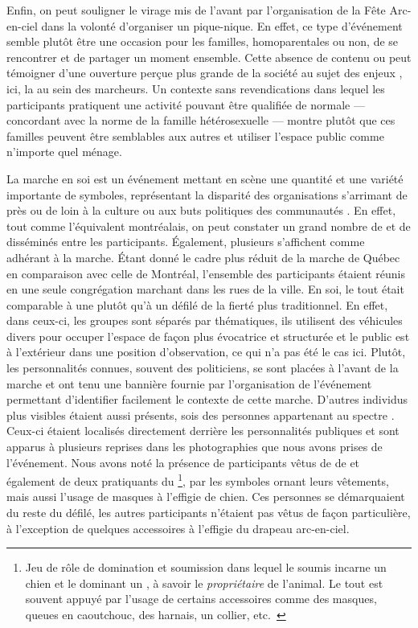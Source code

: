 Enfin, on peut souligner le virage  mis de l'avant par l'organisation de la Fête Arc-en-ciel dans la volonté d'organiser un pique-nique.
En effet, ce type d'événement semble plutôt être une occasion pour les familles, homoparentales ou non, de se rencontrer et de partager un moment ensemble.
Cette absence de contenu  ou  peut témoigner d'une ouverture perçue plus grande de la société au sujet des enjeux \lgbt, ici, la  au sein des marcheurs.
Un contexte sans revendications dans lequel les participants pratiquent une activité pouvant être qualifiée de normale --- concordant avec la norme de la famille hétérosexuelle --- montre plutôt que ces familles peuvent être semblables aux autres et utiliser l'espace public comme n'importe quel ménage.

La marche en soi est un événement mettant en scène une quantité et une variété importante de symboles, représentant la disparité des organisations s'arrimant de près ou de loin à la culture ou aux buts politiques des communautés \lgbt.
En effet, tout comme l'équivalent montréalais, on peut constater un grand nombre de  et de  disséminés entre les participants.
Également, plusieurs  s'affichent comme adhérant à la marche.
Étant donné le cadre plus réduit de la marche de Québec en comparaison avec celle de Montréal, l'ensemble des participants étaient réunis en une seule congrégation marchant dans les rues de la ville.
En soi, le tout était comparable à une  plutôt qu'à un défilé de la fierté plus traditionnel.
En effet, dans ceux-ci, les groupes sont séparés par thématiques, ils utilisent des véhicules divers pour occuper l'espace de façon plus évocatrice et structurée et le public est à l'extérieur dans une position d'observation, ce qui n'a pas été le cas ici.
Plutôt, les personnalités connues, souvent des politiciens, se sont placées à l'avant de la marche et ont tenu une bannière fournie par l'organisation de l'événement permettant d'identifier facilement le contexte de cette marche.
D'autres individus plus visibles étaient aussi présents, sois des personnes appartenant au spectre \bdsm{}.
Ceux-ci étaient localisés directement derrière les personnalités publiques et sont apparus à plusieurs reprises dans les photographies que nous avons prises de l'événement.
Nous avons noté la présence de participants vêtus de  de  et également de deux pratiquants du \footnote{Jeu de rôle de domination et soumission dans lequel le soumis incarne un chien et le dominant un , à savoir le \emph{propriétaire} de l'animal.
  Le tout est souvent appuyé par l'usage de certains accessoires comme des masques, queues en caoutchouc, des harnais, un collier, etc.~\citep[voir][5]{Wignall2015}},
par les symboles ornant leurs vêtements, mais aussi l'usage de masques à l'effigie de chien.
Ces personnes se démarquaient du reste du défilé, les autres participants n'étaient pas vêtus de façon particulière, à l'exception de quelques accessoires à l'effigie du drapeau arc-en-ciel.

